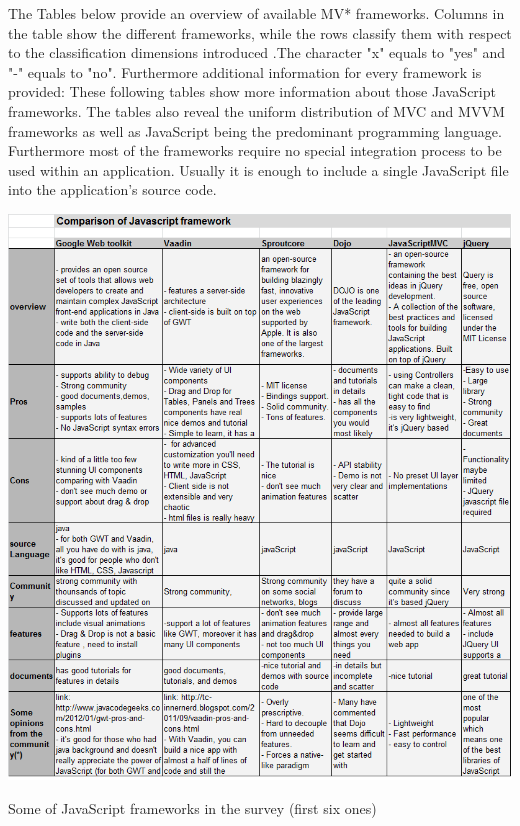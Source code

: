 \documentclass[14pt,a4paper]{extreport}
\begin{document}
The Tables below provide an overview of available MV* frameworks. Columns in the table show the different frameworks, while the  rows classify them with respect to the classification dimensions introduced .The character "x" equals to "yes" and "-" equals to "no". Furthermore additional information for every framework is provided: These following tables show more information about those JavaScript frameworks. The tables also reveal the uniform distribution of MVC and MVVM frameworks as well as JavaScript being the predominant programming language. Furthermore most of the frameworks require no special integration process to be used within an application. Usually it is enough to include a single JavaScript file into the application’s source code. 			
			\begin{table}[ht]
				\begin{center}
					\includegraphics[scale=0.6]{JavaFrameTable1.png}
				
					\caption{Some of JavaScript frameworks in the survey (first six ones)}
				\end{center}
			
			\end{table}
\end{document}
